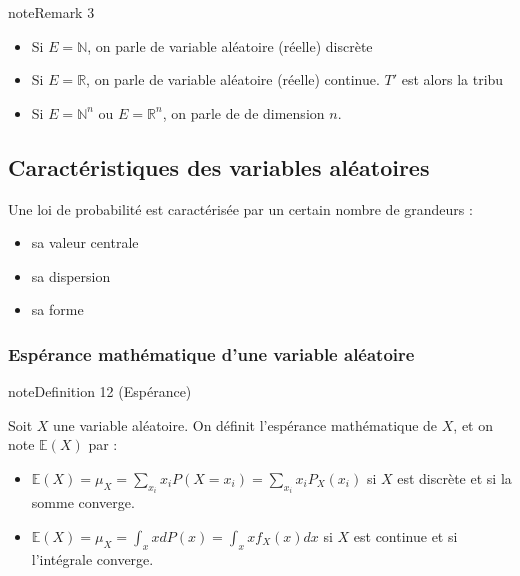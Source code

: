 \documentclass[letterpaper,10pt,english]{jupyterBook}
\begin{document}
\label{Rappels:remark-24}
\begin{sphinxadmonition}{note}{Remark 3}


\begin{itemize}
\item {} 
\sphinxAtStartPar
Si \(E=\mathbb N\), on parle de variable aléatoire (réelle) discrète

\item {} 
\sphinxAtStartPar
Si \(E=\mathbb R\), on parle de variable aléatoire (réelle) continue. \(T'\) est alors la tribu 

\item {} 
\sphinxAtStartPar
Si \(E=\mathbb N^n\) ou \(E=\mathbb R^n\), on parle de  de dimension \(n\).

\end{itemize}
\end{sphinxadmonition}


\subsection{Caractéristiques des variables aléatoires}
\label{\detokenize{Rappels:caracteristiques-des-variables-aleatoires}}
\sphinxAtStartPar
Une loi de probabilité est caractérisée par un certain nombre de grandeurs :
\begin{itemize}
\item {} 
\sphinxAtStartPar
sa valeur centrale

\item {} 
\sphinxAtStartPar
sa dispersion

\item {} 
\sphinxAtStartPar
sa forme

\end{itemize}


\subsubsection{Espérance mathématique d’une variable aléatoire}
\label{\detokenize{Rappels:esperance-mathematique-d-une-variable-aleatoire}}
\ignorespaces \label{Rappels:definition-25}
\begin{sphinxadmonition}{note}{Definition 12 (Espérance)}



\sphinxAtStartPar
Soit \(X\) une variable aléatoire. On définit l’espérance mathématique de \(X\), et on note \(\mathbb E(X)\) par :
\begin{itemize}
\item {} 
\sphinxAtStartPar
\(\mathbb E(X) = \mu_X = \displaystyle\sum_{x_i} x_iP(X=x_i)= \displaystyle\sum_{x_i} x_i P_X(x_i)\) si \(X\) est discrète et si la somme converge.

\item {} 
\sphinxAtStartPar
\(\mathbb E(X) = \mu_X =\int_x xdP(x) = \int_x x f_X(x) dx\) si \(X\) est continue et si l’intégrale converge.

\end{itemize}
\end{sphinxadmonition}
\end{document}
